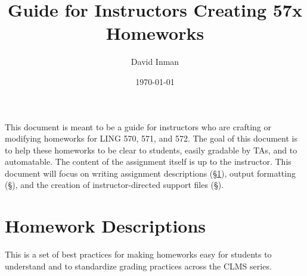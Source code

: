 \documentclass[12pt]{article}
\begin{document}
\title{Guide for Instructors Creating 57x Homeworks}
\author{David Inman}
\date{\today}
\maketitle

\tableofcontents{}

\begin{comment}

\section{Introduction}

\end{comment}

\vspace{20pt}

This document is meant to be a guide for instructors who are crafting or modifying homeworks for LING 570, 571, and 572. The goal of this document is to help these homeworks to be clear to students, easily gradable by TAs, and to automatable. The content of the assignment itself is up to the instructor. This document will focus on writing assignment descriptions (\S\ref{sec:homework}), output formatting (\S), and the creation of instructor-directed support files (\S).

\section{Homework Descriptions} \label{sec:homework}

This is a set of best practices for making homeworks easy for students to understand and to standardize grading practices across the CLMS series.
\end{document}
